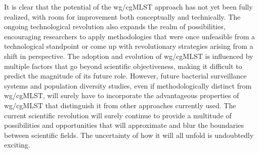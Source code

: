 It is clear that the potential of the \ac{wg/cgMLST} approach has not yet been fully realized, with room for improvement both conceptually and technically. The ongoing technological revolution also expands the realm of possibilities, encouraging researchers to apply methodologies that were once unfeasible from a technological standpoint or come up with revolutionary strategies arising from a shift in perspective. The adoption and evolution of \ac{wg/cgMLST} is influenced by multiple factors that go beyond scientific objectiveness, making it difficult to predict the magnitude of its future role. However, future bacterial surveillance systems and population diversity studies, even if methodologically distinct from \ac{wg/cgMLST}, will surely have to incorporate the advantageous properties of \ac{wg/cgMLST} that distinguish it from other approaches currently used. The current scientific revolution will surely continue to provide a multitude of possibilities and opportunities that will approximate and blur the boundaries between scientific fields. The uncertainty of how it will all unfold is undoubtedly exciting.
